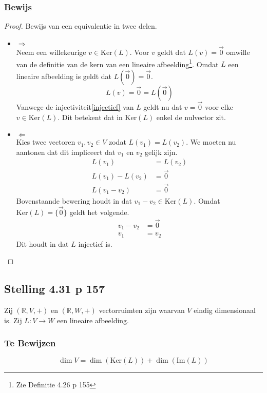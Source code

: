 \documentclass[lineaire_algebra_oplossingen.tex]{subfiles}
\begin{document}
\subsubsection*{Bewijs}
\begin{proof}
Bewijs van een equivalentie in twee delen.
\begin{itemize}
\item $\Rightarrow$\\
Neem een willekeurige $v\in \text{Ker}(L)$. Voor $v$ geldt dat $L(v) = \vec{0}$ omwille van de definitie van de kern van een lineaire afbeelding\footnote{Zie Definitie 4.26 p 155}. Omdat $L$ een lineaire afbeelding is geldt dat $L(\vec{0}) = \vec{0}$.
\[
L(v) = \vec{0} = L(\vec{0})
\]
Vanwege de injectiviteit\ref{injectief} van $L$ geldt nu dat $v=\vec{0}$ voor elke $v \in \text{Ker}(L)$. Dit betekent dat in $\text{Ker}(L)$ enkel de nulvector zit.

\item $\Leftarrow$\\
Kies twee vectoren $v_1,v_2 \in V$ zodat $L(v_1)=L(v_2)$. We moeten nu aantonen dat dit impliceert dat $v_1$ en $v_2$ gelijk zijn.
\begin{align*}
L(v_1) &= L(v_2) \\
L(v_1)-L(v_2) &= \vec{0} \\
L(v_1-v_2) &= \vec{0}
\end{align*}
Bovenstaande bewering houdt in dat $v_1-v_2 \in \text{Ker}(L)$. Omdat $\text{Ker}(L) = \{\vec{0}\}$ geldt het volgende.
\begin{align*}
v_1-v_2 &= \vec{0} \\
v_1 &= v_2
\end{align*}
Dit houdt in dat $L$ injectief is.
\end{itemize}
\end{proof}


\subsection{Stelling 4.31 p 157}
\label{4.31}
Zij $(\mathbb{R},V,+)$ en $(\mathbb{R},W,+)$ vectorruimten zijn waarvan $V$ eindig dimensionaal is. Zij $L:V\rightarrow W$ een lineaire afbeelding.
\subsubsection*{Te Bewijzen}
\[
\dim V = \dim (\text{Ker}(L)) + \dim (\text{Im}(L))
\]
\end{document}
